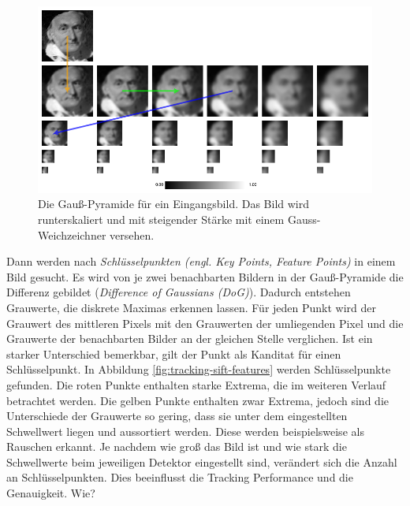 \begin{figure}[H]
    \centering
    \includegraphics[width=\textwidth]{img/tracking/gauss-pyramide.png}
    \caption[Die Gauß-Pyramide für ein Eingangsbild. Das Bild wird runterskaliert und mit steigender Stärke mit einem Gauss-Weichzeichner versehen.]{Die Gauß-Pyramide für ein Eingangsbild. Das Bild wird runterskaliert und mit steigender Stärke mit einem Gauss-Weichzeichner versehen\protect\footnotemark.}
    \label{fig: tracking-gauss-pyramide}
\end{figure}


Dann werden nach \textit{Schlüsselpunkten (engl. Key Points, Feature Points)} in einem Bild gesucht. Es wird von je zwei benachbarten Bildern in der Gauß-Pyramide die Differenz gebildet (\textit{Difference of Gaussians (DoG)}). Dadurch entstehen Grauwerte, die diskrete Maximas erkennen lassen. Für jeden Punkt wird der Grauwert des mittleren Pixels mit den Grauwerten der umliegenden Pixel und die Grauwerte der benachbarten Bilder an der gleichen Stelle verglichen. Ist ein starker Unterschied bemerkbar, gilt der Punkt als Kanditat für einen Schlüsselpunkt. In Abbildung \ref*{fig:tracking-sift-features} werden Schlüsselpunkte gefunden. Die roten Punkte enthalten starke Extrema, die im weiteren Verlauf betrachtet werden. Die gelben Punkte enthalten zwar Extrema, jedoch sind die Unterschiede der Grauwerte so gering, dass sie unter dem eingestellten Schwellwert liegen und aussortiert werden. Diese werden beispielsweise als Rauschen erkannt. Je nachdem wie groß das Bild ist und wie stark die Schwellwerte beim jeweiligen Detektor eingestellt sind, verändert sich die Anzahl an Schlüsselpunkten. Dies beeinflusst die Tracking Performance und die Genauigkeit.
Wie?

